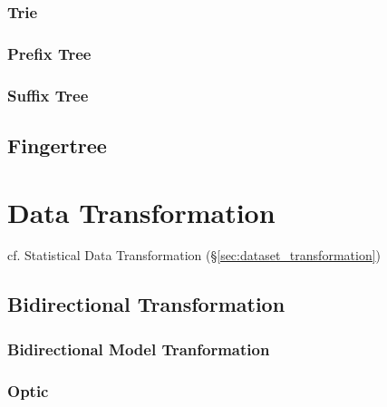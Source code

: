 \subsubsection{Trie}\label{sec:trie}

\subsubsection{Prefix Tree}\label{sec:prefix_tree}

\subsubsection{Suffix Tree}\label{sec:suffix_tree}



\subsection{Fingertree}\label{sec:fingertree}



\section{Data Transformation}\label{sec:data_transformation}

\fist cf. Statistical Data Transformation (\S\ref{sec:dataset_transformation})



\subsection{Bidirectional Transformation}
\label{sec:bidirectional_transformation}

\subsubsection{Bidirectional Model Tranformation}
\label{sec:bidirectional_model_transformation}

\subsubsection{Optic}\label{sec:optic}

